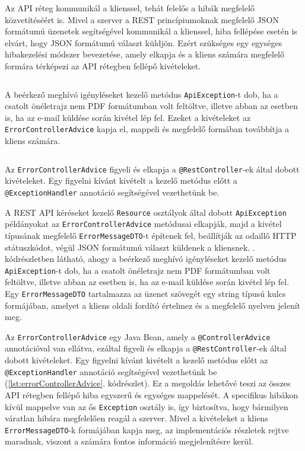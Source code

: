 Az API réteg kommunikál a klienssel, tehát felelős a hibák megfelelő közvetítéséért is. Mivel a szerver a REST princípiumoknak megfelelő JSON formátumú üzenetek segítségével kommunikál a klienssel, hiba fellépése esetén is elvárt, hogy JSON formátumú választ küldjön. Ezért szükséges egy egységes hibakezelési módszer bevezetése, amely elkapja és a kliens számára megfelelő formára térképezi az API rétegben fellépő kivételeket.
\begin{listing}
  \inputminted[fontsize=\small]{java}{progfiles/ApiException.java}
  \caption{A beérkező meghívó igényléseket kezelő metódus \texttt{ApiException}-t dob, ha a csatolt önéletrajz nem PDF formátumban volt feltöltve, illetve abban az esetben is, ha az e-mail küldése során kivétel lép fel. Ezeket a kivételeket az \texttt{ErrorControllerAdvice} kapja el, mappeli és megfelelő formában továbbítja a kliens számára. }
  \label{lst:apiException}
\end{listing}
 \begin{listing}[!b]
  \inputminted[fontsize=\small]{java}{progfiles/ErrorControllerAdvice.java}
  \caption{Az \texttt{ErrorControllerAdvice} figyeli és elkapja a \texttt{@RestController}-ek által dobott kivételeket. Egy figyelni kívánt kivételt a kezelő metódus előtt a  \texttt{@ExceptionHandler} annotáció segítségével vezethetünk be. }
  \label{lst:errorControllerAdvice}
\end{listing}
A REST API kéréseket kezelő \texttt{Resource} osztályok által dobott \texttt{ApiException} példányokat az \texttt{ErrorControllerAdvice} metódusai elkapják, majd a kivétel típusának megfelelő \texttt{ErrorMessageDTO}-t építenek fel, beállítják az odaillő HTTP státuszkódot, végül JSON formátumú választ küldenek a kliensnek. . kódrészletben látható, ahogy a beérkező meghívó igényléseket kezelő metódus \texttt{ApiException}-t dob, ha a csatolt önéletrajz nem PDF formátumban volt feltöltve, illetve abban az esetben is, ha az e-mail küldése során kivétel lép fel. Egy \texttt{ErrorMessageDTO} tartalmazza az üzenet szövegét egy string típusú kulcs formájában, amelyet a kliens oldali fordító értelmez és a megfelelő nyelven jelenít meg.

Az \texttt{ErrorControllerAdvice} egy Java Bean, amely a \texttt{@ControllerAdvice} annotációval van ellátva, ezáltal figyeli és elkapja a \texttt{@RestController}-ek által dobott kivételeket. Egy figyelni kívánt kivételt a kezelő metódus előtt az \texttt{@ExceptionHandler} annotáció segítségével vezethetünk be (\ref{lst:errorControllerAdvice}. kódrészlet). Ez a megoldás lehetővé teszi az összes API rétegben fellépő hiba egyszerű és egységes mappelését. A specifikus hibákon kívül mappelve van az ős \texttt{Exception} osztály is, így biztosítva, hogy bármilyen váratlan hibára megfelelően reagál a szerver. Mivel a kivételeket a kliens \texttt{ErrorMessageDTO}-k formájában kapja meg, az implementációs részletek rejtve maradnak, viszont a számára fontos információ megjelenítésre kerül.  


